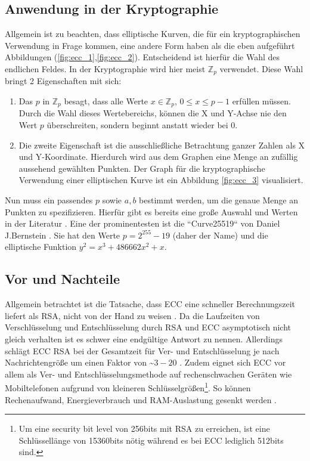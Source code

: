\documentclass[11pt,a4paper]{scrreprt}
\begin{document}
\subsection{Anwendung in der Kryptographie}
Allgemein ist zu beachten, dass elliptische Kurven, die für ein kryptographischen Verwendung in Frage kommen, eine andere Form haben als die eben aufgeführt Abbildungen (\ref{fig:ecc_1},\ref{fig:ecc_2}). Entscheidend ist hierfür die Wahl des endlichen Feldes. In der Kryptographie wird hier meist $\mathbb{Z}_p$ verwendet. Diese Wahl bringt 2 Eigenschaften mit sich:
\begin{enumerate}
    \item Das $p$ in $\mathbb{Z}_p$ besagt, dass alle Werte $x \in \mathbb{Z}_p$, $0 \leq x \leq p-1$ erfüllen müssen. Durch die Wahl dieses Wertebereichs, können die X und Y-Achse nie den Wert $p$ überschreiten, sondern beginnt anstatt wieder bei 0.
    \item Die zweite Eigenschaft ist die ausschließliche Betrachtung ganzer Zahlen als X und Y-Koordinate. Hierdurch wird aus dem Graphen eine Menge an zufällig aussehend gewählten Punkten. Der Graph für die kryptographische Verwendung einer elliptischen Kurve ist ein Abbildung \ref{fig:ecc_3} visualisiert.
\end{enumerate}
Nun muss ein passendes $p$ sowie $a,b$ bestimmt werden, um die genaue Menge an Punkten zu spezifizieren. Hierfür gibt es bereits eine große Auswahl und Werten in der Literatur \cite{ecc-lochter2010elliptic}\cite{ecc-merkle2013elliptic}. Eine der prominentesten ist die ``Curve25519`` von Daniel J.Bernstein \cite{ecc-bernstein2006curve25519}. Sie hat den Werte $p=2^{255}-19$ (daher der Name) und die elliptische Funktion $y^2=x^3+486662x^2+x$.


\subsection{Vor und Nachteile}
Allgemein betrachtet ist die Tatsache, dass ECC eine schneller Berechnungszeit liefert als RSA, nicht von der Hand zu weisen \cite{ecc-cloud2013elliptic}. Da die Laufzeiten von Verschlüsselung und Entschlüsselung durch RSA und ECC asymptotisch nicht gleich verhalten ist es schwer eine endgültige Antwort zu nennen. Allerdings schlägt ECC RSA bei der Gesamtzeit für Ver- und Entschlüsselung je nach Nachrichtengröße um einen Faktor von \textasciitilde $3-20$ \cite{ecc-mahto2018performance}\cite{ecc-bao2022research}. Zudem eignet sich ECC vor allem als Ver- und Entschlüsselungsmethode auf rechenschwachen Geräten wie Mobiltelefonen aufgrund von kleineren Schlüsselgrößen\footnote{Um eine security bit level von 256bits mit RSA zu erreichen, ist eine Schlüssellänge von 15360bits nötig während es bei ECC lediglich 512bits sind.\cite{ecc-mahto2018performance}}. So können Rechenaufwand, Energieverbrauch und RAM-Auslastung gesenkt werden \cite{ecc-gupta2011ecc}.
\end{document}
